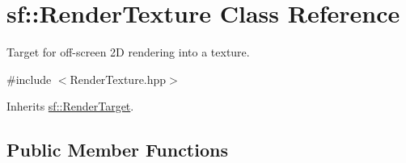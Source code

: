 \hypertarget{classsf_1_1_render_texture}{\section{sf\+:\+:Render\+Texture Class Reference}
\label{classsf_1_1_render_texture}
}


Target for off-\/screen 2\+D rendering into a texture.  




{\ttfamily \#include $<$Render\+Texture.\+hpp$>$}



Inherits \hyperlink{classsf_1_1_render_target}{sf\+::\+Render\+Target}.

\subsection*{Public Member Functions}

